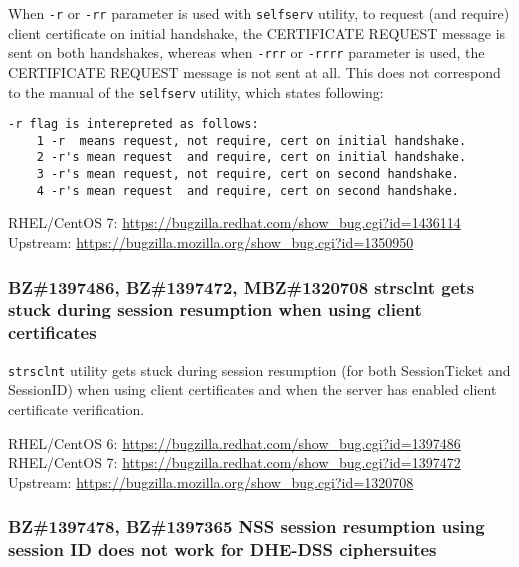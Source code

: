     When \texttt{-r} or \texttt{-rr} parameter is used with \texttt{selfserv}
    utility, to request (and require) client certificate on initial handshake,
    the CERTIFICATE REQUEST message is sent on both handshakes, whereas when
    \texttt{-rrr} or \texttt{-rrrr} parameter is used, the CERTIFICATE REQUEST
    message is not sent at all. This does not correspond to the manual of
    the \texttt{selfserv} utility, which states following:

    \begin{lstlisting}
-r flag is interepreted as follows:
    1 -r  means request, not require, cert on initial handshake.
    2 -r's mean request  and require, cert on initial handshake.
    3 -r's mean request, not require, cert on second handshake.
    4 -r's mean request  and require, cert on second handshake.
    \end{lstlisting}

    \medskip\noindent RHEL/CentOS 7: \url{https://bugzilla.redhat.com/show_bug.cgi?id=1436114}
    \newline\noindent Upstream: \url{https://bugzilla.mozilla.org/show_bug.cgi?id=1350950}

\subsubsection*{BZ\#1397486, BZ\#1397472, MBZ\#1320708  \newline
    strsclnt gets stuck during session resumption when using client certificates}

    \texttt{strsclnt} utility gets stuck during session resumption (for both
    SessionTicket and SessionID) when using client certificates and when the
    server has enabled client certificate verification.

    \medskip\noindent RHEL/CentOS 6: \url{https://bugzilla.redhat.com/show_bug.cgi?id=1397486}
    \newline\noindent RHEL/CentOS 7: \url{https://bugzilla.redhat.com/show_bug.cgi?id=1397472}
    \newline\noindent Upstream: \url{https://bugzilla.mozilla.org/show_bug.cgi?id=1320708}

\subsubsection*{BZ\#1397478, BZ\#1397365  \newline
    NSS session resumption using session ID does not work for DHE-DSS ciphersuites}

